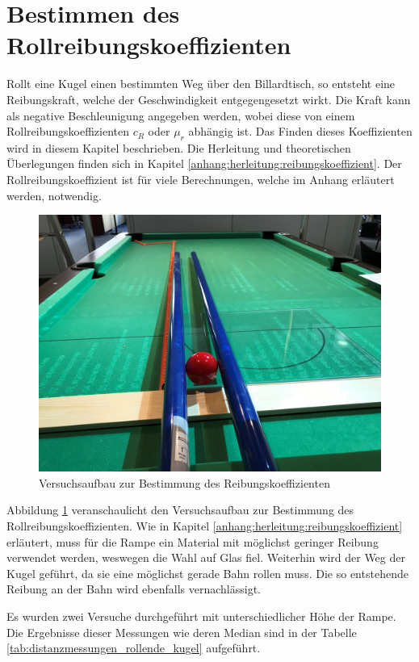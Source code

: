 \section{Bestimmen des Rollreibungskoeffizienten}
Rollt eine Kugel einen bestimmten Weg über den Billardtisch, so entsteht eine Reibungskraft, welche der
Geschwindigkeit entgegengesetzt wirkt. Die Kraft kann als negative Beschleunigung angegeben werden, wobei diese von einem
Rollreibungskoeffizienten $c_R$ oder $\mu_r$ abhängig ist. Das Finden dieses Koeffizienten wird in diesem Kapitel beschrieben.
Die Herleitung und theoretischen Überlegungen finden sich in Kapitel \ref{anhang:herleitung:reibungskoeffizient}.
Der Rollreibungskoeffizient ist für viele Berechnungen, welche im Anhang erläutert werden, notwendig.

\begin{figure}[h!]
    \begin{center}
        \includegraphics[width=0.5\linewidth]{../common/04_results/resources/00_versuchsaufbau_reibungskoeffizient.png}
    \end{center}
    \caption{Versuchsaufbau zur Bestimmung des Reibungskoeffizienten}
    \label{fig:versuchsaufbau_reibungskoeffizient}
\end{figure}

Abbildung \ref{fig:versuchsaufbau_reibungskoeffizient} veranschaulicht den Versuchsaufbau zur Bestimmung des
Rollreibungskoeffizienten. Wie in Kapitel \ref{anhang:herleitung:reibungskoeffizient} erläutert, muss für die
Rampe ein Material mit möglichst geringer Reibung verwendet werden, weswegen die Wahl auf Glas fiel.
Weiterhin wird der Weg der Kugel geführt, da sie eine möglichst gerade Bahn rollen muss. Die so entstehende Reibung
an der Bahn wird ebenfalls vernachlässigt.

Es wurden zwei Versuche durchgeführt mit unterschiedlicher Höhe der Rampe. Die Ergebnisse dieser Messungen wie
deren Median sind in der Tabelle \ref{tab:distanzmessungen_rollende_kugel} aufgeführt.

